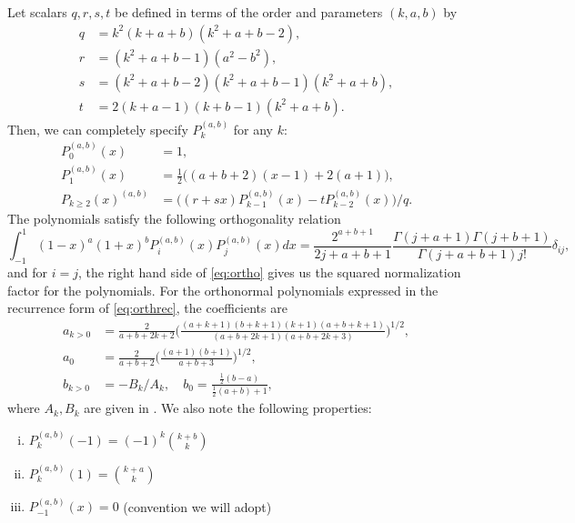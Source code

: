 Let scalars $q,r,s,t$ be defined in terms of the order and parameters $(k,a,b)$ by
\begin{equation}
\begin{split}
q &= k^2(k+a+b)(k^2+a+b-2),\\
r &= (k^2+a+b-1)(a^2-b^2),\\
s &= (k^2+a+b-2)(k^2+a+b-1)(k^2+a+b),\\
t &= 2(k+a-1)(k+b-1)(k^2+a+b).
\end{split}
\end{equation}
Then, we can completely specify $P_k^{(a,b)}$ for any $k$:
\begin{equation}\label{eq:jacdef}
\begin{split}
P_0^{(a,b)}(x) &= 1,\\
P_1^{(a,b)}(x) &= \frac{1}{2}\big((a+b+2)(x-1)+2(a+1)\big),\\
P_{k\geq 2}(x)^{(a,b)} &=\big((r+sx)P_{k-1}^{(a,b)}(x) - tP_{k-2}^{(a,b)}(x)\big)/q.
\end{split}
\end{equation}
The polynomials satisfy the following orthogonality relation
\begin{equation}\label{eq:ortho}
\int_{-1}^1 (1-x)^a(1+x)^bP_i^{(a,b)}(x)P_j^{(a,b)}(x)dx = \frac{2^{a+b+1}}{2j+a+b+1}\frac{\Gamma(j+a+1)\Gamma(j+b+1)}{\Gamma(j+a+b+1)j!}\delta_{ij},
\end{equation}
and for $i=j$, the right hand side of \eqref{eq:ortho} gives us the squared normalization factor for the polynomials. For the orthonormal polynomials expressed in the recurrence form of \eqref{eq:orthrec}, the coefficients are 
\begin{align}
a_{k>0} &= \frac{2}{a+b+2k+2}\Big(\frac{(a+k+1)(b+k+1)(k+1)(a+b+k+1)}{(a+b+2k+1)(a+b+2k+3)} \Big)^{1/2},\\
a_0 &= \frac{2}{a+b+2}\Big(\frac{(a+1)(b+1)}{a+b+3}\Big)^{1/2},\\
b_{k>0} &= -B_k/A_k,\quad  b_0 = \frac{\frac{1}{2}(b-a)}{\frac{1}{2}(a+b)+1},
\end{align}
where $A_k,B_k$ are given in \cite[Eq. 18.9.2]{DLMF}. We also note the following properties:
\begin{enumerate}[(i)]
	\item $P_k^{(a,b)}(-1) = (-1)^k {k+b\choose k}$
	\item $P_k^{(a,b)}(1) = {k+a \choose k}$
	\item $P_{-1}^{(a,b)}(x) = 0$ (convention we will adopt)
\end{enumerate}
